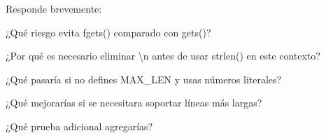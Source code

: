 Responde brevemente\+:
\begin{DoxyEnumerate}
\item ¿\+Qué riesgo evita {\ttfamily fgets()} comparado con {\ttfamily gets()}?
\item ¿\+Por qué es necesario eliminar {\ttfamily \textbackslash{}n} antes de usar {\ttfamily strlen()} en este contexto?
\item ¿\+Qué pasaría si no defines {\ttfamily MAX\+\_\+\+LEN} y usas números literales?
\item ¿\+Qué mejorarías si se necesitara soportar líneas más largas?
\item ¿\+Qué prueba adicional agregarías? 
\end{DoxyEnumerate}